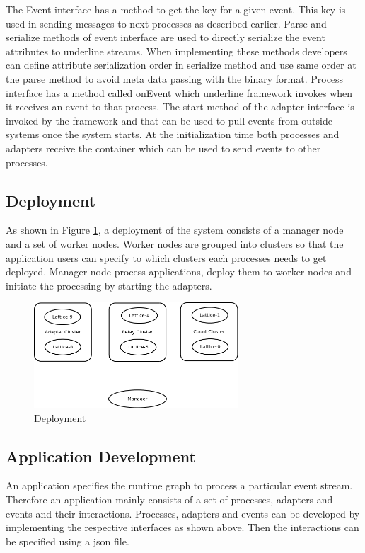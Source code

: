  The Event interface has a method to get the key for a given event. This key is used in sending messages to next processes as described earlier. Parse and serialize methods of event interface are used to directly serialize the event attributes to underline streams. When implementing these methods developers can define attribute serialization order in serialize method and use same order at the parse method to avoid meta data passing with the binary format. Process interface has a method called onEvent which underline framework invokes when it receives an event to that process. The start method of the adapter interface is invoked by the framework and that can be used to pull events from outside systems once the system starts. At the initialization time both processes and adapters receive the container which can be used to send events to other processes.
 
 \subsection{Deployment}

As shown in Figure \ref{deployment}, a deployment of the system consists of a manager node and a set of worker nodes. Worker nodes are grouped into clusters so that the application users can specify to which clusters each processes needs to get deployed. Manager node process applications, deploy them to worker nodes and initiate the processing by starting the adapters.

\begin{figure}[!t]
        \centering
        \includegraphics[width=3.0in]{deployment.png}
        \caption{Deployment}
        \label{deployment}
\end{figure}

\subsection{Application Development}

An application specifies the runtime graph to process a particular event stream. Therefore an application mainly consists of a set of processes, adapters and events and their interactions. Processes, adapters and events can be developed by implementing the respective interfaces as shown above. Then the interactions can be specified using a json file. 

